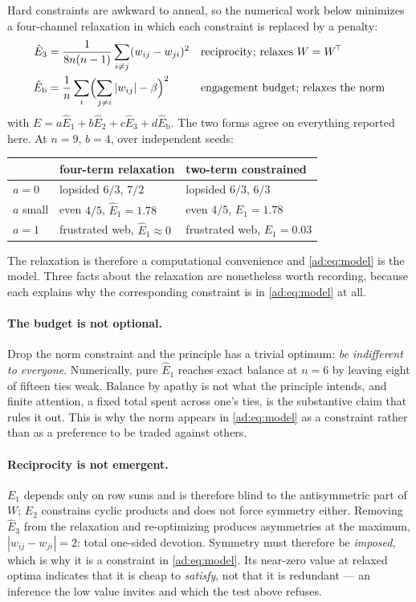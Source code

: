 \documentclass[11pt]{article}
\numberwithin{equation}{section}
\theoremstyle{plain}
\theoremstyle{definition}
\theoremstyle{remark}
\begin{document}
Hard constraints are awkward to anneal, so the numerical work below
minimizes a four-channel relaxation in which each constraint is
replaced by a penalty:
\begin{align}
\hat E_3&=\frac{1}{8n(n-1)}\sum_{i\ne j}(w_{ij}-w_{ji})^{2}
&&\text{reciprocity; relaxes } W=W^{\!\top}\label{ad:eq:E3}\\
\hat E_{\mathrm b}&=\frac1n\sum_i\Bigl(\sum_{j\ne i}|w_{ij}|-\beta\Bigr)^{2}
&&\text{engagement budget; relaxes the norm}\label{ad:eq:Eb}
\end{align}
with $E=a\hat E_1+b\hat E_2+c\hat E_3+d\hat E_{\mathrm b}$. The two forms
agree on everything reported here. At $n=9$, $b=4$, over independent
seeds:
\begin{center}\small
\begin{tabular}{@{}lll@{}}
\toprule
& four-term relaxation & two-term constrained\\
\midrule
$a=0$ & lopsided $6/3$, $7/2$ & lopsided $6/3$, $6/3$\\
$a$ small & even $4/5$, $\hat E_1=1.78$ & even $4/5$, $E_1=1.78$\\
$a=1$ & frustrated web, $\hat E_1\approx0$ & frustrated web, $E_1=0.03$\\
\bottomrule
\end{tabular}
\end{center}
The relaxation is therefore a computational convenience and
\eqref{ad:eq:model} is the model. Three facts about the relaxation are
nonetheless worth recording, because each explains why the
corresponding constraint is in \eqref{ad:eq:model} at all.

\paragraph{The budget is not optional.}\label{ad:rem:apathy}
Drop the norm constraint and the principle has a trivial optimum:
\emph{be indifferent to everyone}. Numerically, pure $\hat E_1$ reaches
exact balance at $n=6$ by leaving eight of fifteen ties weak. Balance by
apathy is not what the principle intends, and finite attention, a
fixed total spent across one's ties, is the substantive claim that
rules it out. This is why the norm appears in \eqref{ad:eq:model} as a
constraint rather than as a preference to be traded against others.

\paragraph{Reciprocity is not emergent.}\label{ad:rem:recip}
$E_1$ depends only on row sums and is therefore blind to the
antisymmetric part of $W$; $E_2$ constrains cyclic products and does not
force symmetry either. Removing $\hat E_3$ from the relaxation and
re-optimizing produces asymmetries at the maximum,
$|w_{ij}-w_{ji}|=2$: total one-sided devotion. Symmetry must therefore
be \emph{imposed}, which is why it is a constraint in
\eqref{ad:eq:model}. Its near-zero value at relaxed optima indicates
that it is cheap to \emph{satisfy}, not that it is redundant --- an
inference the low value invites and which the test above refuses.
\end{document}
